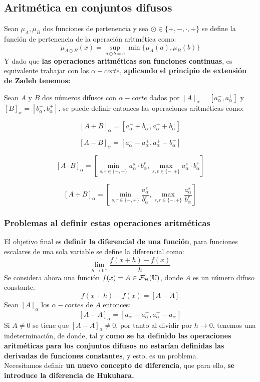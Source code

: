   \subsection{Aritmética en conjuntos difusos}
  Sean $\mu_A, \mu_B$ dos funciones de pertenencia y sea $\odot \in \{+, -, \cdot, \div\}$ se define la función de pertenencia de la operación aritmética como:
  $$
  \mu_{A \odot B}(x) = \sup_{a \odot b = c} \min\{\mu_A(a), \mu_B(b)\}
  $$
  Y dado que \textbf{las operaciones aritméticas son funciones continuas}, es equivalente trabajar con los $\alpha-corte$, \textbf{aplicando el principio de extensión de Zadeh tenemos:}

  Sean $A$ y $B$ dos números difusos con $\alpha-corte$ dados por $[A]_\alpha=[a_\alpha^-, a_\alpha^+]$ y $[B]_\alpha=[b_\alpha^-, b_\alpha^+]$, se puede definir entonces las operaciones aritméticas como:

  $$
  [A+B]_\alpha = [a_\alpha^- + b_\alpha^-, a_\alpha^+ + b_\alpha^+]
  $$

  $$
  [A-B]_\alpha = [a_\alpha^- - a_\alpha^+, a_\alpha^+ - b_\alpha^-]
  $$

  $$
  [A \cdot B]_\alpha = \left[ \min_{s, r \in \{-, +\}} a_\alpha^s \cdot b_\alpha^r, \max_{s, r \in \{-, +\}} a_\alpha^s \cdot b_\alpha^r\right]
  $$

  $$
  [A \div B]_\alpha = \left[ \min_{s, r \in \{-, +\}} \frac{a_\alpha^s}{b_\alpha^r}, \max_{s, r \in \{-, +\}} \frac{a_\alpha^s}{b_\alpha^r}\right]
  $$

  \subsubsection{Problemas al definir estas operaciones aritméticas}
  El objetivo final es \textbf{definir la diferencial de una función}, para funciones escalares de una sola variable se define la diferencial como:
  $$
  \lim\limits_{h\rightarrow 0^+} \frac{f(x+h) - f(x)}{h}
  $$
  Se considera ahora una función $f(x)=A\in \mathcal{F}_\mathcal{H}(\mathbb U)$, donde $A$ es un número difuso constante. \\
  $$f(x+h) - f(x)=[A-A]$$
  Sean $[A]_\alpha$ los $\alpha-cortes$ de $A$ entonces:
  $$
  [A-A]_\alpha = [a_\alpha^- - a_\alpha^+, a_\alpha^+ - a_\alpha^-]
  $$
  Si $A\neq 0$ se tiene que $[A-A]_\alpha \neq 0$, por tanto al dividir por $h \rightarrow 0$, tenemos una indeterminación, de donde, tal y \textbf{como se ha definido las operaciones aritméticas para los conjuntos difusos no estarían definidas las derivadas de funciones constantes}, y esto, es un problema. \\
  Necesitamos definir \textbf{un nuevo concepto de diferencia}, que para ello, \textbf{se introduce la diferencia de Hukuhara.}

